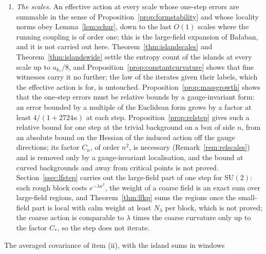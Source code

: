 \documentclass[11pt]{amsart}
\theoremstyle{definition}
\theoremstyle{remark}
\numberwithin{equation}{section}
\newcommand{\SU}{\mathrm{SU}}
\begin{document}
\begin{enumerate}[label=\textup{(\roman*)},leftmargin=*]
gives the explicit coupling $\beta^*(\rho,s)$ past which the islands of
bad blocks at one scale are rare enough to beat their entropy, at the
exponent $1/H$ of Proposition~\ref{prop:coverageopt} and the collar of
Proposition~\ref{prop:graphlaw}. What is not given is the same statement
at the scale of the cube: $\beta^*$ is of order $10^{13}$ at the witness
radius $10^{-4}$ of Theorem~\ref{thm:islandswide}, and of order $10^{37}$ under the calmness of Corollary~\ref{cor:twoislands}, far beyond the
range in which the chessboard estimate reaches that scale, so that (iv) is
needed before the threshold bears on the gap.
\item \emph{The scales.} An effective action at every scale whose
one-step errors are summable in the sense of
Proposition~\ref{prop:formstability} and whose locality norms obey
Lemma~\ref{lem:schur}, down to the last $O(1)$ scales where the running
coupling is of order one; this is the large-field expansion of
Ba{\l}aban, and it is not carried out here. Theorem~\ref{thm:islandscales}
and Theorem~\ref{thm:islandswide} settle the entropy count of the islands
at every scale up to $a_{k_*}/8$, and Proposition~\ref{prop:constantcurvature} shows that
fine witnesses carry it no further; the law of the iterates given their
labels, which the effective action is for, is untouched.
Proposition~\ref{prop:massgrowth} shows that the one-step errors must be
relative bounds by a gauge-invariant form: an error bounded by a multiple
of the Euclidean form grows by a factor at least $4/(1+2724\kappa)$ at each
step. Proposition~\ref{prop:relstep} gives such a relative bound
for one step at the trivial background on a box of side $n$, from an
absolute bound on the Hessian of the induced action off the gauge
directions; its factor $C_n$, of order $n^2$, is necessary
(Remark~\ref{rem:relscales}) and is removed only by a gauge-invariant
localisation, and the bound at curved backgrounds and away from critical
points is not proved. Section~\ref{ssec:lfstep} carries out the large-field
part of one step for $\SU(2)$: each rough block costs $e^{-\lambda\kappa^2}$,
the weight of a coarse field is an exact sum over large-field regions, and
Theorem~\ref{thm:lfkp} sums the regions once the small-field part is local
with calm weight at least $N_\lambda$ per block, which is not proved; the
coarse action is comparable to $\lambda$ times the coarse curvature only up
to the factor $C_*$, so the step does not iterate.
\end{enumerate}
The averaged covariance of item (ii), with the island sums in windows
\end{document}
